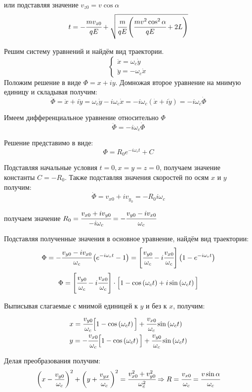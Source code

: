 или подставляя значение \( v_{z0} = v\cos\alpha \)
\[
	t = -\cfrac{mv_{z0}}{qE} + 
	\sqrt{ \cfrac{m}{qE}\left( \cfrac{mv^2\cos^2\alpha}{qE} + 2L \right)}
\]

Решим систему уравнений и найдём вид траектории.
\[
	\left\{ \begin{array}{ll}
		\ddot{x} = \omega_c\dot{y} \\
		\ddot{y} = -\omega_c\dot{x}
	\end{array}\right.
\]
Положим решение в виде \( \Phi = x + iy \). Домножая второе уравнение на 
мнимую единицу и складывая получим:
\[
	\ddot{\Phi} = \ddot{x} + i\ddot{y} = 
	\omega_c\dot{y} - i\omega_c\dot{x} = 
	-i\omega_c\left( \dot{x} + i\dot{y} \right) = 
	-i\omega_c\dot{\Phi}
\]

Имеем дифференциальное уравнение относительно \( \Phi \)
\[\ddot{\Phi} = -i\omega_c\dot{\Phi} \]

Решение представимо в виде:
\[
	\Phi = R_0 e^{-i\omega_c t} + C
\]

Подставляя начальные условия \( t = 0, x = y = z = 0 \), получаем значение 
константы \( C = -R_0 \). Также подставляя значения скоростей по осям 
\( x \) и \( y \) получим:
\[
	\dot{\Phi} = v_{x0} + iv_{y_0} = -R_0 i\omega_c
\]

получаем значение 
\( 
	R_0  = \cfrac{v_{x0} + iv_{y0}}{-i\omega_c} = 
	-\cfrac{v_{y0} - iv_{x0}}{\omega_c} 
\)

Подставляя полученные значения в основное уравнение, найдём вид траектории:
\[
	\Phi = -\cfrac{v_{y0} - iv_{x0}}{\omega_c} 
	\left( e^{-i\omega_c t} - 1 \right ) = 
	\left[ \cfrac{v_{y0}}{\omega_c} - i \cfrac{v_{x0}}{\omega_c} \right]
	\left( 1 - e^{-i\omega_c t} \right)
\]
\[
	\Phi = 
	\left[ \cfrac{v_{y0}}{\omega_c} - i \cfrac{v_{x0}}{\omega_c} \right]
	\cdot\Big[ 1 - \cos\left(\omega_c t\right) + 
		i\sin\left( \omega_c t\right) \Big] 
\]

Выписывая слагаемые с мнимой единицей к \( y \) и без к \( x \), получим:
\[
	\begin{array}{ll}
		x = \cfrac{v_{y0}}{\omega_c}
			\Big[ 1 - \cos\left( \omega_c t \right) \Big] + 
			\cfrac{v_{x0}}{\omega_c}\sin\left( \omega_c t \right) \\
		y = -\cfrac{v_{x0}}{\omega_c}
			\Big[ 1 - \cos\left( \omega_c t \right) \Big] + 
			\cfrac{v_{y0}}{\omega_c}\sin\left( \omega_c t \right) \\
	\end{array}
\]

Делая преобразования получим:
\[
	\left( x - \frac{v_{y0}}{\omega_c} \right)^2 + 
	\left( y + \frac{v_{yx}}{\omega_c} \right)^2 = 
	\cfrac{v^2_{x0} + v^2_{y0}}{\omega^2_c} 
	\Rightarrow R = \cfrac{v_{x0}}{\omega_c} = 
	\cfrac{v\sin\alpha}{\omega_c}
\]

